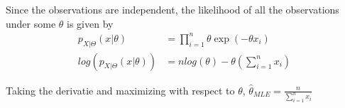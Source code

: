 \documentclass[../../probability-notes.tex]{subfile}
\begin{document}
        Since the observations are independent, the likelihood of all the observations under some $\theta$ is given by
        \begin{align*}
            p_{X|\Theta}(x|\theta) &= \prod_{i=1}^{n} \theta \exp(-\theta x_{i})\\
            log(p_{X|\Theta}(x|\theta)) &= n log(\theta) - \theta(\sum_{i=1}^{n} x_{i})
        \end{align*}

        Taking the derivatie and maximizing with respect to $\theta$, $\hat{\theta}_{MLE} = \frac{n}{\sum_{i=1}^{n}x_{i}}$
\end{document}
